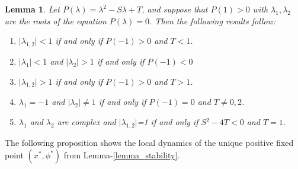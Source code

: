 \documentclass{article}
\newtheorem{lemma}[theorem]{Lemma}
\begin{document}
\vspace{0.5cm}
\begin{lemma}
        Let $P(\lambda)=\lambda^2-S\lambda+T$, and suppose that $P(1)>0$ with $\lambda_1, \lambda_2$ are the roots of the equation $P(\lambda)=0$. Then the following results follow:    
 \begin{enumerate}\label{lemma_stability}
     \item $ \lvert \lambda_{1,2} \rvert <1$ if and only if $P(-1)>0$ and $T<1$.
     \item $\lvert \lambda_1 \rvert <1$ and $\lvert \lambda_2 \rvert >1$ if and only if $P(-1)<0$
     \item $\lvert \lambda_{1,2} \rvert >1$ if and only if $P(-1)>0$ and $T>1$.
     \item $ \lambda_1  =-1$ and $\lvert \lambda_2 \rvert \neq1$ if and only if $P(-1)=0$ and $T \neq0,2$.
     \item $\lambda_1$ and $\lambda_2$ are complex and $\lvert\lambda_{1,2}\rvert$=1 if and only if $S{^2}-4T<0$ and $T=1$.
 \end{enumerate}   
\end{lemma}

\noindent The following proposition shows the local dynamics of the unique positive fixed point $(x^*,\phi^*)$ from Lemma-\ref{lemma_stability}. 
\end{document}
